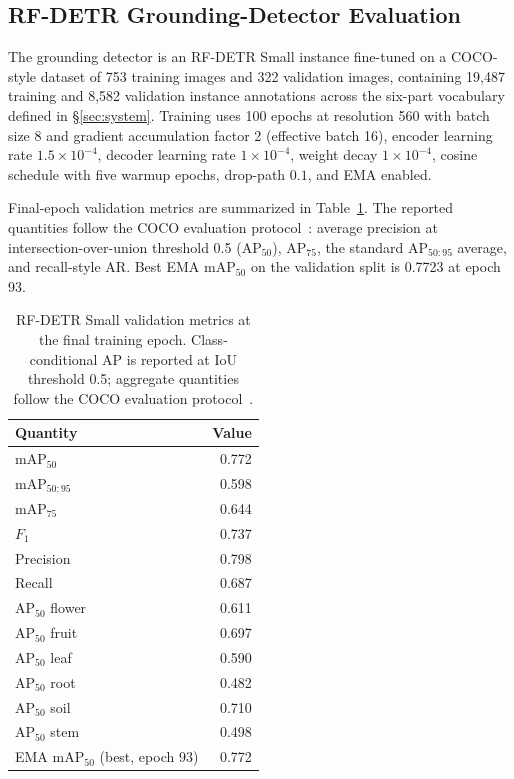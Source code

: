 \subsection{RF-DETR Grounding-Detector Evaluation}
\label{sec:results-detector}

The grounding detector is an RF-DETR Small instance fine-tuned on a
COCO-style dataset of 753 training images and 322 validation images,
containing 19{,}487 training and 8{,}582 validation instance
annotations across the six-part vocabulary defined in
\S\ref{sec:system}. Training uses 100 epochs at resolution 560 with
batch size 8 and gradient accumulation factor 2 (effective batch 16),
encoder learning rate $1.5\times 10^{-4}$, decoder learning rate
$1\times 10^{-4}$, weight decay $1\times 10^{-4}$, cosine schedule
with five warmup epochs, drop-path $0.1$, and EMA enabled.

Final-epoch validation metrics are summarized in
Table~\ref{tab:rfdetr-final}. The reported quantities follow the COCO
evaluation protocol~\citep{lin2014cocoeval}: average precision at
intersection-over-union threshold 0.5 ($\mathrm{AP}_{50}$),
$\mathrm{AP}_{75}$, the standard $\mathrm{AP}_{50:95}$ average, and
recall-style $\mathrm{AR}$. Best EMA $\mathrm{mAP}_{50}$ on the
validation split is 0.7723 at epoch 93.

\begin{table}[H]
\centering
\caption{RF-DETR Small validation metrics at the final training epoch.
Class-conditional AP is reported at IoU threshold 0.5; aggregate
quantities follow the COCO evaluation protocol~\citep{lin2014cocoeval}.}
\label{tab:rfdetr-final}
\begin{tabular}{lr}
\toprule
Quantity & Value \\
\midrule
$\mathrm{mAP}_{50}$ & 0.772 \\
$\mathrm{mAP}_{50:95}$ & 0.598 \\
$\mathrm{mAP}_{75}$ & 0.644 \\
$F_1$ & 0.737 \\
Precision & 0.798 \\
Recall & 0.687 \\
$\mathrm{AP}_{50}$ flower & 0.611 \\
$\mathrm{AP}_{50}$ fruit & 0.697 \\
$\mathrm{AP}_{50}$ leaf & 0.590 \\
$\mathrm{AP}_{50}$ root & 0.482 \\
$\mathrm{AP}_{50}$ soil & 0.710 \\
$\mathrm{AP}_{50}$ stem & 0.498 \\
EMA $\mathrm{mAP}_{50}$ (best, epoch 93) & 0.772 \\
\bottomrule
\end{tabular}
\end{table}


